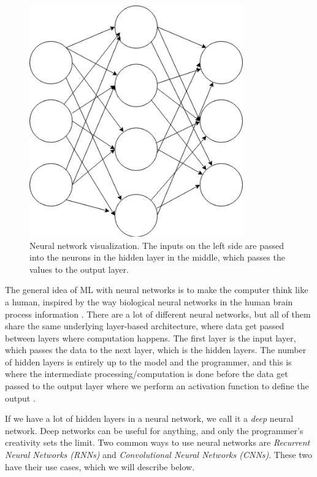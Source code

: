 \begin{figure}[!ht]
    \begin{center}
        \includegraphics[height=10cm]{neural_net.png}
        \caption{Neural network visualization. The inputs on the left side are passed into the neurons in the hidden layer in the middle, which passes the values to the output layer.}
        \label{figure:neural_net}
    \end{center}
\end{figure}

The general idea of ML with neural networks is to make the computer think like a human, inspired by the way biological neural networks in the human 
brain process information \cite{deep_learning}. There are a lot of different neural networks, but all of them share the same underlying layer-based architecture, 
where data get passed between layers where computation happens. The first layer is the input layer, which passes the data to the next layer, which is the hidden layers. 
The number of hidden layers is entirely up to the model and the programmer, and this is where the intermediate processing/computation is done before the data get passed 
to the output layer where we perform an activation function to define the output \cite{deep_learning}.

If we have a lot of hidden layers in a neural network, we call it a \textit{deep} neural network. Deep networks can be useful for anything, and only the programmer's creativity sets the limit. Two common ways to use neural networks are \textit{Recurrent Neural Networks (RNNs)} and \textit{Convolutional Neural Networks (CNNs)}. These two have their use cases, which we will describe below.

